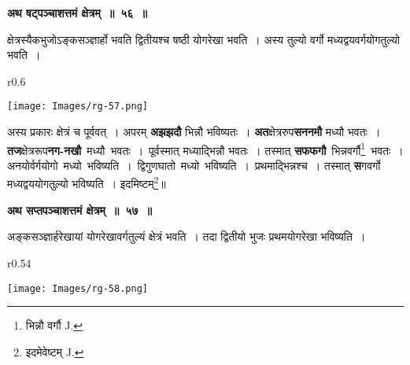 \documentclass[11pt, openany]{book}
\begin{document}
\begin{center}
\textbf{\large अथ षट्पञ्चाशत्तमं क्षेत्रम्~॥~५६~॥ }
\end{center}

{\ab क्षेत्रस्यैकभुजोऽङ्कसञ्ज्ञार्हो भवति द्वितीयश्च षष्ठी योगरेखा भवति~। अस्य तुल्यो वर्गो मध्यद्वयवर्गयोगतुल्यो भवति~। }\\

\begin{wrapfigure}{r}{0.6\textwidth}
\vspace{-9mm}
\begin{flushright}
\texttt{[image: Images/rg-57.png]}
\end{flushright}
\vspace{-8mm}
\end{wrapfigure}

 अस्य प्रकारः क्षेत्रं च पूर्ववत्~। अपरम् \textbf{अझझदौ} भिन्नौ भविष्यतः~। \textbf{अत}क्षेत्ररुप\textbf{सननमौ} मध्यौ भवतः~। \textbf{तज}क्षेत्ररूप\textbf{नग-नखौ} \,मध्यौ \,भवतः~। \,पूर्वस्मात् मध्याद्भिन्नौ \;भवतः~। \;तस्मात् \textbf{सफफगौ} \,भिन्नवर्गौ\renewcommand{\thefootnote}{२}\footnote{भिन्नौ वर्गौ {\en J.}} \,भवतः~। अनयोर्वर्गयोगो \,मध्यो \,भविष्यति~। \,द्विगुणघातो \,मध्यो \,भविष्यति~। \,प्रथमाद्भिन्नश्च~। तस्मात् \textbf{स}गवर्गो मध्यद्वययोगतुल्यो भविष्यति~। इदमिष्टम्\renewcommand{\thefootnote}{३}\footnote{इदमेवेष्टम् J.}\;॥ 
\vspace{2mm}
 
\begin{center}
\textbf{\large  अथ सप्तपञ्चाशत्तमं क्षेत्रम्~॥~५७~॥ }
\end{center}

 {\ab अङ्कसञ्ज्ञार्हरेखायां योगरेखावर्गतुल्यं क्षेत्रं भवति~। तदा द्वितीयो भुजः प्रथमयोगरेखा भविष्यति~।} 

\newpage

\begin{wrapfigure}{r}{0.54\textwidth}
\vspace{-3mm}
\begin{flushright}
\texttt{[image: Images/rg-58.png]}
\end{flushright}
\vspace{-8mm}
\end{wrapfigure}
\end{document}

